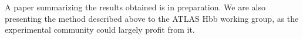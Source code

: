\documentclass[10pt,a4paper]{book}
\begin{document}
A paper summarizing the results obtained is in preparation. We are also presenting the method described above to the ATLAS Hbb working group, as the experimental community could largely profit from it.

\end{document}
